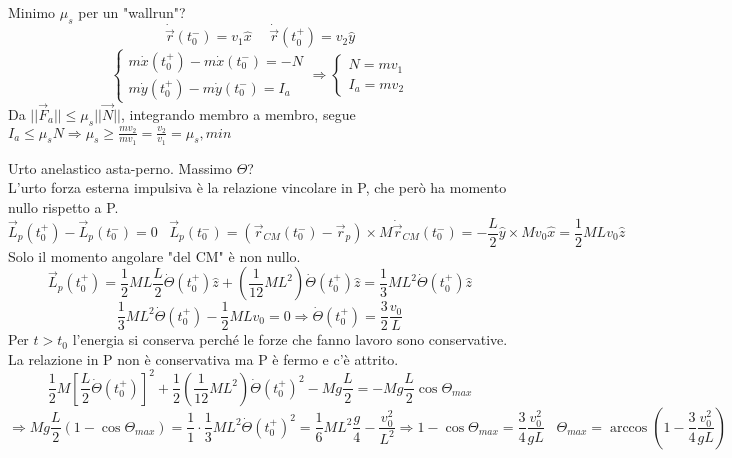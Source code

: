 \begin{example}
    Minimo $\mu_s$ per un "wallrun"?
    $$\dot{\vec{r}}(t_0^-) = v_1 \hat{x} \hspace{15pt} \dot{\vec{r}}(t_0^+) = v_2\hat{y}$$
    $$
    \begin{cases}
        m\dot{x}(t_0^+) - m\dot{x}(t_0^-) = -N\\
        m\dot{y}(t_0^+) - m\dot{y}(t_0^-) = I_a
    \end{cases}
    \Rightarrow
    \begin{cases}
        N = mv_1 \\
        I_a = mv_2
    \end{cases}
    $$
    Da $||\vec{F}_a|| \leq \mu_s||\vec{N}||$, integrando membro a membro, segue $I_a \leq \mu_s N \Rightarrow \mu_s \geq \frac{mv_2}{mv_1} = \frac{v_2}{v_1} = \mu_s,min$
\end{example}
\begin{example}
    Urto anelastico asta-perno. Massimo $\Theta$?\\
    L'urto forza esterna impulsiva è la relazione vincolare in P, che però ha momento nullo rispetto a P.
    $$\vec{L}_p(t_0^+) - \vec{L}_p(t_0^-) = 0 \hspace{10pt}\vec{L}_p(t_0^-) = (\vec{r}_{CM}(t_0^-) - \vec{r}_p) \times M\dot{\vec{r}}_{CM}(t_0^-) = -\frac{L}{2}\hat{y} \times Mv_0 \hat{x} = \frac{1}{2}MLv_0\hat{z}$$
    Solo il momento angolare "del CM" è non nullo.
    $$\vec{L}_p(t_0^+) = \frac{1}{2}ML \frac{L}{2}\dot{\Theta}(t_0^+)\hat{z} + (\frac{1}{12}ML^2)\dot{\Theta}(t_0^+)\hat{z} = \frac{1}{3}ML^2 \dot{\Theta}(t_0^+)\hat{z}$$
    $$\frac{1}{3}ML^2\dot{\Theta}(t_0^+) - \frac{1}{2}MLv_0 = 0 \Rightarrow \dot{\Theta}(t_0^+) = \frac{3}{2}\frac{v_0}{L}$$
    Per $t > t_0$ l'energia si conserva perché le forze che fanno lavoro sono conservative. La relazione in P non è conservativa ma P è fermo e c'è attrito.
    $$\frac{1}{2}M[\frac{L}{2}\dot{\Theta}(t_0^+)]^2 + \frac{1}{2}(\frac{1}{12}ML^2)\dot{\Theta}(t_0^+)^2 - Mg\frac{L}{2} = -Mg \frac{L}{2}\cos\Theta_{max}$$
    $$\Rightarrow Mg \frac{L}{2}(1 - \cos\Theta_{max}) = \frac{1}{1}\cdot \frac{1}{3}ML^2\dot{\Theta}(t_0^+)^2 = \frac{1}{6}ML^2 \frac{g}{4} - \frac{v_0^2}{L^2} \Rightarrow 1 - \cos\Theta_{max} = \frac{3}{4}\frac{v_0^2}{gL} \hspace{10pt}\Theta_{max} = \arccos(1-\frac{3}{4}\frac{v_0^2}{gL})$$
\end{example}